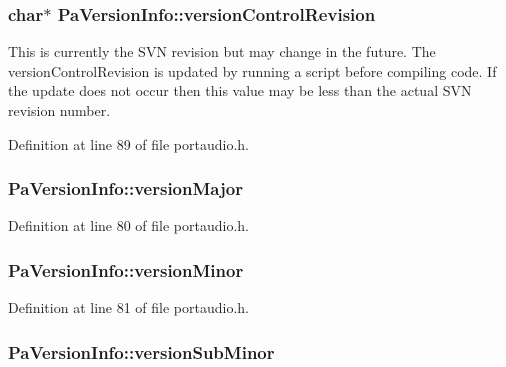 \subsubsection[{\texorpdfstring{version\+Control\+Revision}{versionControlRevision}}]{ char$\ast$ Pa\+Version\+Info\+::version\+Control\+Revision}\hypertarget{struct_pa_version_info_a4f8c2b786c9d5013e978e1218ad9ab22}{}\label{struct_pa_version_info_a4f8c2b786c9d5013e978e1218ad9ab22}
This is currently the S\+VN revision but may change in the future. The version\+Control\+Revision is updated by running a script before compiling code. If the update does not occur then this value may be less than the actual S\+VN revision number. 

Definition at line 89 of file portaudio.\+h.

\subsubsection[{\texorpdfstring{version\+Major}{versionMajor}}]{ Pa\+Version\+Info\+::version\+Major}\hypertarget{struct_pa_version_info_aae9ff4383171955022ebd26c0c0d4d2e}{}\label{struct_pa_version_info_aae9ff4383171955022ebd26c0c0d4d2e}


Definition at line 80 of file portaudio.\+h.

\subsubsection[{\texorpdfstring{version\+Minor}{versionMinor}}]{ Pa\+Version\+Info\+::version\+Minor}\hypertarget{struct_pa_version_info_aee2f42cc57f0a018481d73e016722952}{}\label{struct_pa_version_info_aee2f42cc57f0a018481d73e016722952}


Definition at line 81 of file portaudio.\+h.

\subsubsection[{\texorpdfstring{version\+Sub\+Minor}{versionSubMinor}}]{ Pa\+Version\+Info\+::version\+Sub\+Minor}\hypertarget{struct_pa_version_info_aa789c4034fc38c91ffecb4f81fc3ae6b}{}\label{struct_pa_version_info_aa789c4034fc38c91ffecb4f81fc3ae6b}


